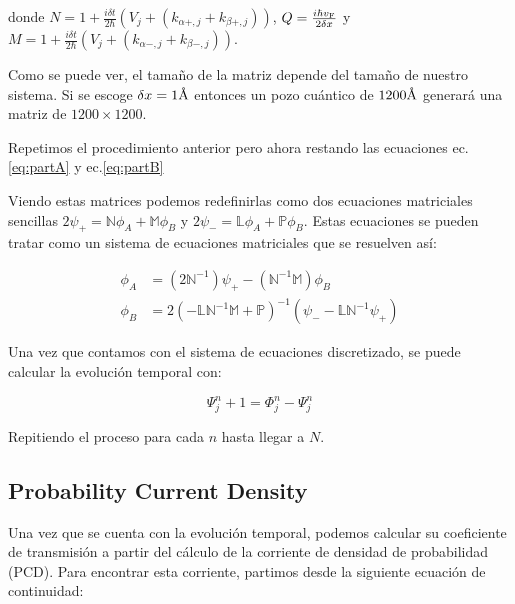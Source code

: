     \noindent donde $N =1 + \frac{i\delta t}{2\hbar} \left( V_j + \left(k_{\alpha+,j}+k_{\beta+,j}\right)\right)$, $Q=\frac{i\hbar v_{\mbox{\tiny F}}}{2\delta x}$ y $M =1 + \frac{i\delta t}{2\hbar}\left( V_j + \left(k_{\alpha-,j}+k_{\beta-,j}\right)\right)$.
    
    Como se puede ver, el tamaño de la matriz depende del tamaño de nuestro sistema.
    Si se escoge $\delta x = 1\textup{\AA}$ entonces un pozo cuántico de $1200\textup{\AA}$ generará una matriz de $1200\times1200$.

    Repetimos el procedimiento anterior pero ahora restando las ecuaciones ec.\eqref{eq:partA} y ec.\eqref{eq:partB}

    Viendo estas matrices podemos redefinirlas como dos ecuaciones matriciales sencillas $2\psi_+=\mathbb{N}\phi_A+\mathbb{M}\phi_B$ y $2\psi_-=\mathbb{L}\phi_A+\mathbb{P}\phi_B$.
    Estas ecuaciones se pueden tratar como un sistema de ecuaciones matriciales que se resuelven así:

    \begin{align}
        \label{eq:sistemaMatricial}
        \phi_A&=(2\mathbb{N}^{-1})\psi_+-(\mathbb{N}^{-1}\mathbb{M})\phi_B\nonumber\\
        \phi_B&=2(-\mathbb{L}\mathbb{N}^{-1}\mathbb{M}+\mathbb{P})^{-1}(\psi_--\mathbb{L}\mathbb{N}^{-1}\psi_+)
    \end{align}

    Una vez que contamos con el sistema de ecuaciones discretizado, se puede calcular la evolución temporal con:

    \begin{equation}
        \label{eq:siguienteTiempo}
        \Psi_j^n+1=\Phi_j^n-\Psi_j^n
    \end{equation}

    Repitiendo el proceso para cada $n$ hasta llegar a $N$.


    \subsection{Probability Current Density}\label{subsec:probability-current-density}

    Una vez que se cuenta con la evolución temporal, podemos calcular su coeficiente de transmisión a partir del cálculo de la corriente de densidad de probabilidad (PCD).
    Para encontrar esta corriente, partimos desde la siguiente ecuación de continuidad:


